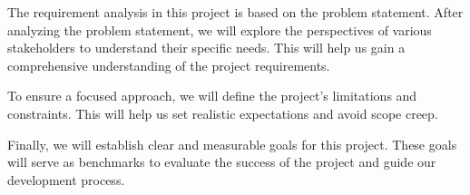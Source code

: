 The requirement analysis in this project is based on the problem statement.
After analyzing the problem statement, we will explore the perspectives of various stakeholders 
to understand their specific needs. 
This will help us gain a comprehensive understanding of the project requirements.

To ensure a focused approach, we will define the project's limitations and constraints. 
This will help us set realistic expectations and avoid scope creep.

Finally, we will establish clear and measurable goals for this project. 
These goals will serve as benchmarks to evaluate the success of the project 
and guide our development process.
